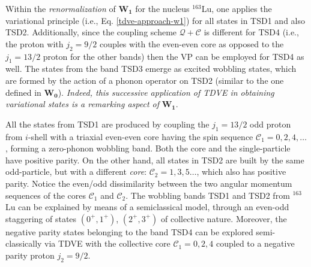 Within the \emph{renormalization} of $\mathbf{W_1}$ for the nucleus $^{163}$Lu, one applies the variational principle (i.e., Eq. \ref{tdve-approach-w1}) for all states in TSD1 and also TSD2. Additionally, since the coupling scheme $\mathcal{Q}+\mathscr{C}$ is different for TSD4 (i.e., the proton with $j_2=9/2$ couples with the even-even core as opposed to the $j_1=13/2$ proton for the other bands) then the VP can be employed for TSD4 as well. The states from the band TSD3 emerge as excited wobbling states, which are formed by the action of a phonon operator on TSD2 (similar to the one defined in $\mathbf{W_0}$). \emph{Indeed, this successive application of TDVE in obtaining variational states is a remarking aspect of} $\mathbf{W_1}$.

All the states from TSD1 are produced by coupling the $j_1=13/2$ odd proton from $i$-shell with a triaxial even-even core having the spin sequence $\mathscr{C}_1=0,2,4,\dots$, forming a zero-phonon wobbling band. Both the core and the single-particle have positive parity. On the other hand, all states in TSD2 are built by the same odd-particle, but with a different \emph{core}: $\mathscr{C}_2=1,3,5\dots$, which also has positive parity. Notice the even/odd dissimilarity between the two angular momentum sequences of the cores $\mathscr{C}_1$ and $\mathscr{C}_2$. The wobbling bands TSD1 and TSD2 from $^{163}$Lu can be explained by means of a semiclassical model, through an even-odd staggering of states $(0^+,1^+)$, $(2^+,3^+)$ of collective nature. Moreover, the negative parity states belonging to the band TSD4 can be explored semi-classically via TDVE with the collective core $\mathscr{C}_1=0,2,4$ coupled to a negative parity proton $j_2=9/2$.

